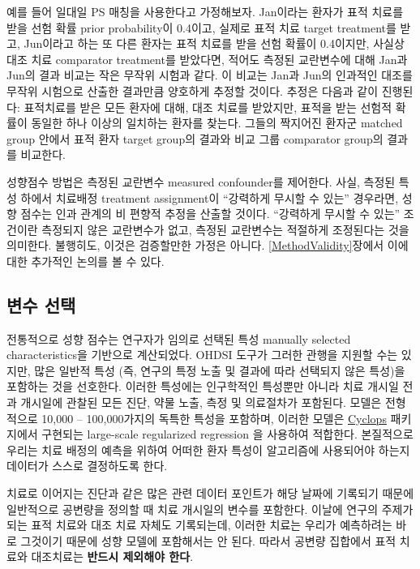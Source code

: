 \documentclass[10.5pt]{book}
\theoremstyle{definition}
\theoremstyle{definition}
\theoremstyle{definition}
\theoremstyle{remark}
\let\BeginKnitrBlock\begin \let\EndKnitrBlock\end
\begin{document}
예를 들어 일대일 PS 매칭을 사용한다고 가정해보자. Jan이라는 환자가 표적
치료를 받을 선험 확률 prior probability이 0.4이고, 실제로 표적 치료
target treatment를 받고, Jun이라고 하는 또 다른 환자는 표적 치료를 받을
선험 확률이 0.4이지만, 사실상 대조 치료 comparator treatment를 받았다면,
적어도 측정된 교란변수에 대해 Jan과 Jun의 결과 비교는 작은 무작위 시험과
같다. 이 비교는 Jan과 Jun의 인과적인 대조를 무작위 시험으로 산출한
결과만큼 양호하게 추정할 것이다. 추정은 다음과 같이 진행된다: 표적치료를
받은 모든 환자에 대해, 대조 치료를 받았지만, 표적을 받는 선험적 확률이
동일한 하나 이상의 일치하는 환자를 찾는다. 그들의 짝지어진 환자군
matched group 안에서 표적 환자 target group의 결과와 비교 그룹
comparator group의 결과를 비교한다.

성향점수 방법은 측정된 교란변수 measured confounder를 제어한다. 사실,
측정된 특성 하에서 치료배정 treatment assignment이 ``강력하게 무시할 수
있는'' 경우라면, 성향 점수는 인과 관계의 비 편향적 추정을 산출할 것이다.
``강력하게 무시할 수 있는'' 조건이란 측정되지 않은 교란변수가 없고,
측정된 교란변수는 적절하게 조정된다는 것을 의미한다. 불행히도, 이것은
검증할만한 가정은 아니다. \ref{MethodValidity}장에서 이에 대한 추가적인
논의를 볼 수 있다. 

\subsection{변수 선택}\label{VariableSelection}

전통적으로 성향 점수는 연구자가 임의로 선택된 특성 manually selected
characteristics을 기반으로 계산되었다. OHDSI 도구가 그러한 관행을 지원할
수는 있지만, 많은 일반적 특성 (즉, 연구의 특정 노출 및 결과에 따라
선택되지 않은 특성)을 포함하는 것을 선호한다. \citep{tian_2018} 이러한
특성에는 인구학적인 특성뿐만 아니라 치료 개시일 전과 개시일에 관찰된
모든 진단, 약물 노출, 측정 및 의료절차가 포함된다. 모델은 전형적으로
10,000 -- 100,000가지의 독특한 특성을 포함하며, 이러한 모델은
\href{https://ohdsi.github.io/Cyclops/}{Cyclops} 패키지에서 구현되는
large-scale regularized regression \citep{suchard_2013} 을 사용하여
적합한다. 본질적으로 우리는 치료 배정의 예측을 위하여 어떠한 환자 특성이
알고리즘에 사용되어야 하는지 데이터가 스스로 결정하도록 한다.

\BeginKnitrBlock{rmdimportant}
치료로 이어지는 진단과 같은 많은 관련 데이터 포인트가 해당 날짜에
기록되기 때문에 일반적으로 공변량을 정의할 때 치료 개시일의 변수를
포함한다. 이날에 연구의 주제가 되는 표적 치료와 대조 치료 자체도
기록되는데, 이러한 치료는 우리가 예측하려는 바로 그것이기 때문에 성향
모델에 포함해서는 안 된다. 따라서 공변량 집합에서 표적 치료와 대조치료는
\textbf{반드시 제외해야 한다}.
\EndKnitrBlock{rmdimportant}
\end{document}
